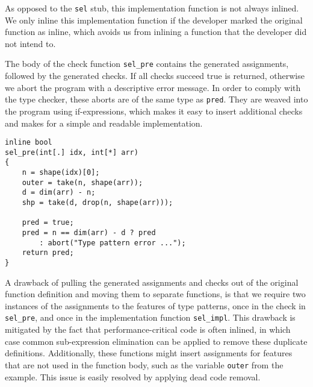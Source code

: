 \noindent
As opposed to the \texttt{sel} stub, this implementation function is not always inlined.
We only inline this implementation function if the developer marked the original function as inline, which avoids us from inlining a function that the developer did not intend to.

The body of the check function \texttt{sel\_pre} contains the generated assignments, followed by the generated checks.
If all checks succeed true is returned, otherwise we abort the program with a descriptive error message.
In order to comply with the type checker, these aborts are of the same type as \texttt{pred}.
They are weaved into the program using if-expressions, which makes it easy to insert additional checks and makes for a simple and readable implementation.
\begin{lstlisting}
inline bool
sel_pre(int[.] idx, int[*] arr)
{
    n = shape(idx)[0];
    outer = take(n, shape(arr));
    d = dim(arr) - n;
    shp = take(d, drop(n, shape(arr)));

    pred = true;
    pred = n == dim(arr) - d ? pred
        : abort("Type pattern error ...");
    return pred;
}
\end{lstlisting}

\noindent
A drawback of pulling the generated assignments and checks out of the original function definition and moving them to separate functions, is that we require two instances of the assignments to the features of type patterns, once in the check in \texttt{sel\_pre}, and once in the implementation function \texttt{sel\_impl}.
This drawback is mitigated by the fact that performance-critical code is often inlined, in which case common sub-expression elimination can be applied to remove these duplicate definitions.
Additionally, these functions might insert assignments for features that are not used in the function body, such as the variable \texttt{outer} from the example.
This issue is easily resolved by applying dead code removal.
